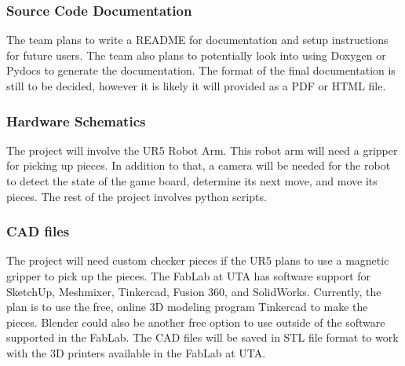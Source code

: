 \subsubsection{Source Code Documentation}

The team plans to write a README for documentation and setup instructions for future users. The team also plans to potentially look into using Doxygen or Pydocs to generate the documentation. The format of the final documentation is still to be decided, however it is likely it will provided as a PDF or HTML file.



\subsubsection{Hardware Schematics}
The project will involve the UR5 Robot Arm. This robot arm will need a gripper for picking up pieces. In addition to that, a camera will be needed for the robot to detect the state of the game board, determine its next move, and move its pieces. The rest of the project involves python scripts.


\subsubsection{CAD files}
The project will need custom checker pieces if the UR5 plans to use a magnetic gripper to pick up the pieces. The FabLab at UTA has software support for SketchUp, Meshmixer, Tinkercad, Fusion 360, and SolidWorks. Currently, the plan is to use the free, online 3D modeling program Tinkercad to make the pieces. Blender could also be another free option to use outside of the software supported in the FabLab. The CAD files will be saved in STL file format to work with the 3D printers available in the FabLab at UTA.

